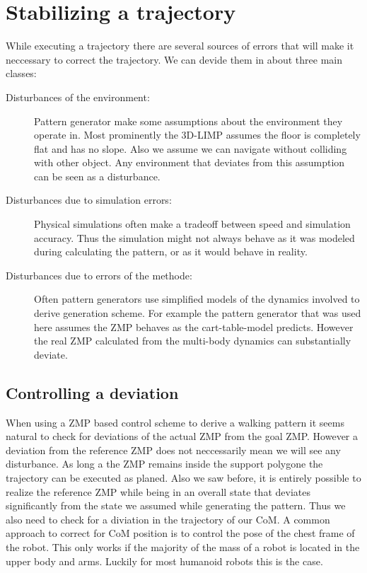 \documentclass[english,ngerman]{KITreprt}
\begin{document}
\chapter{Stabilizing a trajectory}\label{stabilizing-a-trajectory}

While executing a trajectory there are several sources of errors that
will make it neccessary to correct the trajectory. We can devide them in
about three main classes:

\begin{description}
\item[Disturbances of the environment:]
Pattern generator make some assumptions about the environment they
operate in. Most prominently the 3D-LIMP assumes the floor is completely
flat and has no slope. Also we assume we can navigate without colliding
with other object. Any environment that deviates from this assumption
can be seen as a disturbance.
\item[Disturbances due to simulation errors:]
Physical simulations often make a tradeoff between speed and simulation
accuracy. Thus the simulation might not always behave as it was modeled
during calculating the pattern, or as it would behave in reality.
\item[Disturbances due to errors of the methode:]
Often pattern generators use simplified models of the dynamics involved
to derive generation scheme. For example the pattern generator that was
used here assumes the ZMP behaves as the cart-table-model predicts.
However the real ZMP calculated from the multi-body dynamics can
substantially deviate.
\end{description}

\section{Controlling a deviation}\label{controlling-a-deviation}

When using a ZMP based control scheme to derive a walking pattern it
seems natural to check for deviations of the actual ZMP from the goal
ZMP. However a deviation from the reference ZMP does not neccessarily
mean we will see any disturbance. As long a the ZMP remains inside the
support polygone the trajectory can be executed as planed. Also we saw
before, it is entirely possible to realize the reference ZMP while being
in an overall state that deviates significantly from the state we
assumed while generating the pattern. Thus we also need to check for a
diviation in the trajectory of our CoM. A common approach to correct for
CoM position is to control the pose of the chest frame of the robot.
This only works if the majority of the mass of a robot is located in the
upper body and arms. Luckily for most humanoid robots this is the case.
\end{document}
